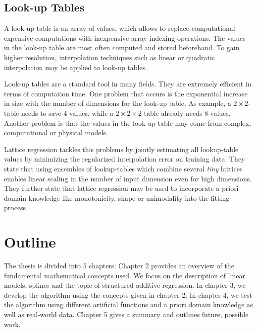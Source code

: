 \documentclass[10pt,a4paper]{article}
\begin{document}
\subsection{Look-up Tables}

A look-up table is an array of values, which allows to replace computational expensive computations with inexpensive array indexing operations. The values in the look-up table are most often computed and stored beforehand. To gain higher resolution, interpolation techniques such as linear or quadratic interpolation may be applied to look-up tables. 

Look-up tables are a standard tool in many fields. They are extremely efficient in terms of computation time. One problem that occurs is the exponential increase in size with the number of dimensions for the look-up table. As example, a $2 \times 2$-table needs to save 4 values, while a $2 \times 2 \times 2$ table already needs 8 values. Another problem is that the values in the look-up table may come from complex, computational or physical models. 

Lattice regression tackles this problems by jointly estimating all lookup-table values by minimizing the regularized interpolation error on training data. \cite{garcia2009lattice} They state that using ensembles of lookup-tables which combine several \emph{tiny} lattices enables linear scaling in the number of input dimension even for high dimensions. \cite{fard2016fast} They further state that lattice regression may be used to incorporate a priori domain knowledge like monotonicity, shape or unimodality into the fitting process. \cite{gupta2016monotonic} \cite{you2017deep}

\section{Outline}

The thesis is divided into 5 chapters: Chapter 2 provides an overview of the fundamental mathematical concepts used. We focus on the description of linear models, splines and the topic of structured additive regression. In chapter 3, we develop the algorithm using the concepts given in chapter 2. In chapter 4, we test the algorithm using different artificial functions and a priori domain knowledge as well as real-world data. Chapter 5 gives a summary and outlines future, possible work. 
\end{document}
